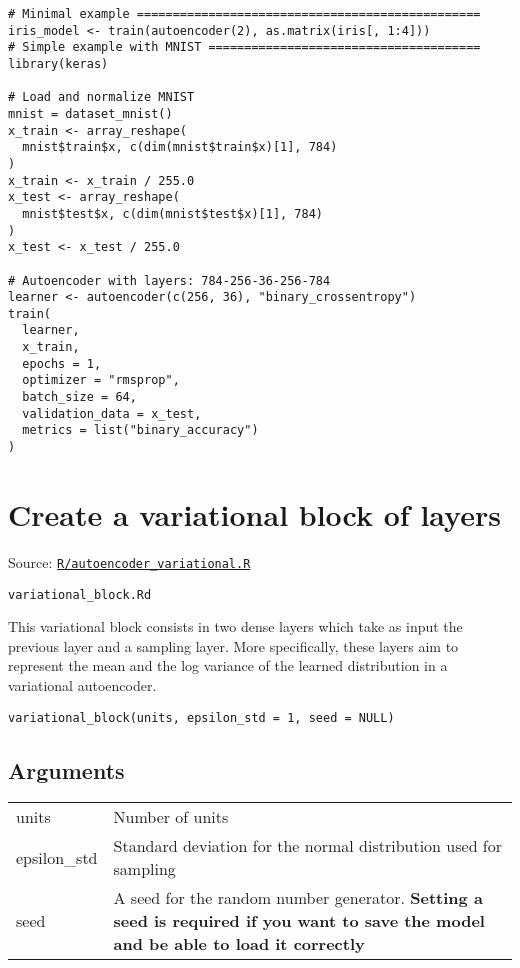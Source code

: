 \begin{verbatim}
# Minimal example ================================================
iris_model <- train(autoencoder(2), as.matrix(iris[, 1:4]))
# Simple example with MNIST ======================================
library(keras)

# Load and normalize MNIST
mnist = dataset_mnist()
x_train <- array_reshape(
  mnist$train$x, c(dim(mnist$train$x)[1], 784)
)
x_train <- x_train / 255.0
x_test <- array_reshape(
  mnist$test$x, c(dim(mnist$test$x)[1], 784)
)
x_test <- x_test / 255.0

# Autoencoder with layers: 784-256-36-256-784
learner <- autoencoder(c(256, 36), "binary_crossentropy")
train(
  learner,
  x_train,
  epochs = 1,
  optimizer = "rmsprop",
  batch_size = 64,
  validation_data = x_test,
  metrics = list("binary_accuracy")
)
\end{verbatim}

\section{Create a variational block of
layers}\label{create-a-variational-block-of-layers}

Source:
\href{https://github.com/fdavidcl/ruta/blob/master/R/autoencoder_variational.R}{\texttt{R/autoencoder\_variational.R}}

\texttt{variational\_block.Rd}

This variational block consists in two dense layers which take as input
the previous layer and a sampling layer. More specifically, these layers
aim to represent the mean and the log variance of the learned
distribution in a variational autoencoder.

\begin{verbatim}
variational_block(units, epsilon_std = 1, seed = NULL)
\end{verbatim}

\hypertarget{arguments}{\subsection{\texorpdfstring{\protect\hyperlink{arguments}{}Arguments}{Arguments}}\label{arguments}}

\begin{longtable}[c]{@{}ll@{}}
\toprule
units & Number of units\tabularnewline
epsilon\_std & Standard deviation for the normal distribution used for
sampling\tabularnewline
seed & A seed for the random number generator. \textbf{Setting a seed is
required if you want to save the model and be able to load it
correctly}\tabularnewline
\bottomrule
\end{longtable}

